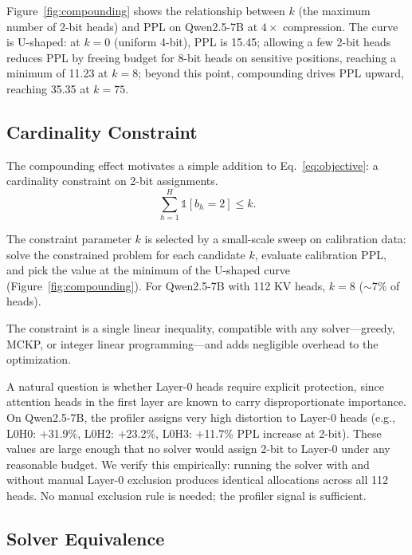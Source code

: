 Figure~\ref{fig:compounding} shows the relationship between $k$ (the maximum number of 2-bit heads) and PPL on Qwen2.5-7B at $4\times$ compression.
The curve is U-shaped: at $k{=}0$ (uniform 4-bit), PPL is 15.45; allowing a few 2-bit heads reduces PPL by freeing budget for 8-bit heads on sensitive positions, reaching a minimum of 11.23 at $k{=}8$; beyond this point, compounding drives PPL upward, reaching 35.35 at $k{=}75$.

\subsection{Cardinality Constraint}
\label{sec:cardinality}

The compounding effect motivates a simple addition to Eq.~\eqref{eq:objective}: a cardinality constraint on 2-bit assignments.
\begin{equation}
\label{eq:constraint}
\sum_{h=1}^{H} \mathbb{1}[b_h = 2] \leq k.
\end{equation}

The constraint parameter $k$ is selected by a small-scale sweep on calibration data: solve the constrained problem for each candidate $k$, evaluate calibration PPL, and pick the value at the minimum of the U-shaped curve (Figure~\ref{fig:compounding}).
For Qwen2.5-7B with 112 KV heads, $k{=}8$ ($\sim$7\% of heads).

The constraint is a single linear inequality, compatible with any solver---greedy, MCKP, or integer linear programming---and adds negligible overhead to the optimization.

A natural question is whether Layer-0 heads require explicit protection, since attention heads in the first layer are known to carry disproportionate importance.
On Qwen2.5-7B, the profiler assigns very high distortion to Layer-0 heads (e.g., L0H0: $+$31.9\%, L0H2: $+$23.2\%, L0H3: $+$11.7\% PPL increase at 2-bit).
These values are large enough that no solver would assign 2-bit to Layer-0 under any reasonable budget.
We verify this empirically: running the solver with and without manual Layer-0 exclusion produces identical allocations across all 112 heads.
No manual exclusion rule is needed; the profiler signal is sufficient.

\subsection{Solver Equivalence}
\label{sec:solver_equiv}

